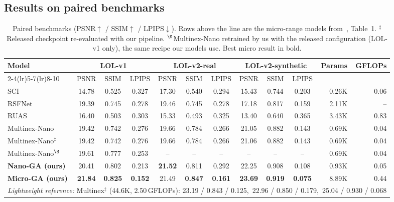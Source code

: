 \documentclass[10pt,twocolumn,letterpaper]{article}
\newcommand{\best}[1]{\textbf{#1}}
\begin{document}
\subsection{Results on paired benchmarks}
\begin{table}[t]
\centering
\caption{Paired benchmarks (PSNR$\uparrow$ / SSIM$\uparrow$ / LPIPS$\downarrow$).
Rows above the line are the micro-range models from~\cite{brateanu2026multinex}, Table~1.
$^{\ddagger}$Released checkpoint re-evaluated with our pipeline.
$^{\S}$Multinex-Nano retrained by us with the released configuration (LOL-v1 only),
the same recipe our models use. Best micro result in bold.}
\label{tab:lol}
\small
\setlength{\tabcolsep}{4.2pt}
\begin{tabular}{lcccccccccrr}
\toprule
\multirow{2}{*}{Model} & \multicolumn{3}{c}{LOL-v1} & \multicolumn{3}{c}{LOL-v2-real} & \multicolumn{3}{c}{LOL-v2-synthetic} & \multirow{2}{*}{Params} & \multirow{2}{*}{GFLOPs} \\
\cmidrule(lr){2-4}\cmidrule(lr){5-7}\cmidrule(lr){8-10}
 & PSNR & SSIM & LPIPS & PSNR & SSIM & LPIPS & PSNR & SSIM & LPIPS & & \\
\midrule
SCI~\cite{ma2022sci}           & 14.78 & 0.525 & 0.327 & 17.30 & 0.540 & 0.294 & 15.43 & 0.744 & 0.203 & 0.26K & 0.06 \\
RSFNet~\cite{ouyang2023rsfnet} & 19.39 & 0.745 & 0.278 & 19.46 & 0.745 & 0.278 & 17.18 & 0.817 & 0.159 & 2.11K & -- \\
RUAS~\cite{liu2021ruas}        & 16.40 & 0.503 & 0.303 & 15.33 & 0.493 & 0.325 & 13.40 & 0.640 & 0.365 & 3.43K & 0.83 \\
Multinex-Nano~\cite{brateanu2026multinex} & 19.42 & 0.742 & 0.276 & 19.66 & 0.784 & 0.266 & 21.05 & 0.882 & 0.143 & 0.69K & 0.04 \\
Multinex-Nano$^{\ddagger}$     & 19.42 & 0.742 & 0.276 & 19.66 & 0.784 & 0.266 & 21.06 & 0.882 & 0.143 & 0.69K & 0.04 \\
Multinex-Nano$^{\S}$           & 19.61 & 0.777 & 0.253 & -- & -- & -- & -- & -- & -- & 0.69K & 0.04 \\
\midrule
\textbf{Nano-GA (ours)}        & 20.41 & 0.802 & 0.213 & \best{21.52} & 0.811 & 0.292 & 22.25 & 0.908 & 0.108 & 0.93K & 0.05 \\
\textbf{Micro-GA (ours)}       & \best{21.84} & \best{0.825} & \best{0.152} & 21.49 & \best{0.847} & \best{0.161} & \best{23.69} & \best{0.919} & \best{0.075} & 8.89K & 0.44 \\
\midrule
\multicolumn{12}{l}{\emph{Lightweight reference:} Multinex$^{\ddagger}$ (44.6K, 2.50\,GFLOPs): 23.19 / 0.843 / 0.125,\ 22.96 / 0.850 / 0.179,\ 25.04 / 0.930 / 0.068} \\
\bottomrule
\end{tabular}
\end{table}
\end{document}
